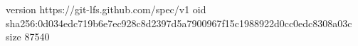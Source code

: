 version https://git-lfs.github.com/spec/v1
oid sha256:0d034edc719b6e7ec928c8d2397d5a7900967f15c1988922d0cc0edc8308a03c
size 87540

